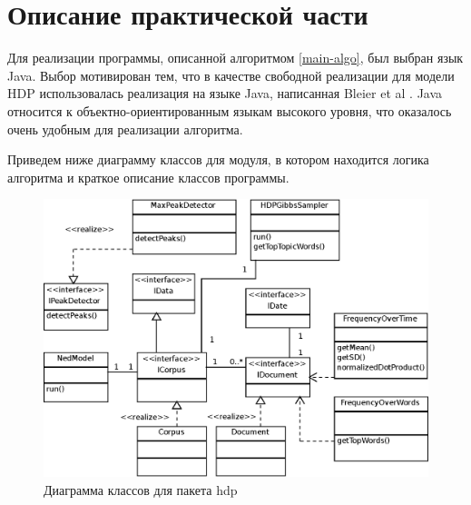 \documentclass[14pt,a4paper,oneside]{extarticle}
\newcommand\todo[1]{\marginpar{\textcolor{red}{#1}}}
\begin{document}
	\section{Описание практической части}
Для реализации программы, описанной алгоритмом \ref{main-algo}, был выбран язык Java. Выбор мотивирован тем, что в качестве свободной реализации для модели HDP использовалась реализация на языке Java, написанная Bleier et al \cite{hdp-2}. Java относится к объектно-ориентированным языкам высокого уровня, что оказалось очень удобным для реализации алгоритма.	
	
	Приведем ниже диаграмму классов для модуля, в котором находится логика алгоритма и краткое описание классов программы.	
	
	\begin{figure}[H]
	\centering
	\includegraphics[width=15cm]{ClassDiagramHDP.eps}	
	\caption{Диаграмма классов для пакета hdp}
	\end{figure}	
	
\end{document}
